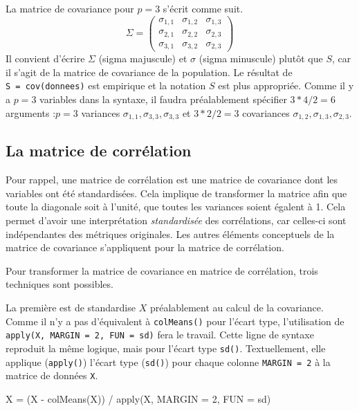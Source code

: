 \documentclass[
]{book}
\newenvironment{Shaded}{}{}
\newcommand{\AttributeTok}[1]{#1}
\newcommand{\DecValTok}[1]{#1}
\newcommand{\FunctionTok}[1]{#1}
\newcommand{\NormalTok}[1]{#1}
\newcommand{\OtherTok}[1]{#1}
\newcommand{\SpecialCharTok}[1]{#1}
\begin{document}
La matrice de covariance pour \(p=3\) s'écrit comme suit.
\[
\Sigma = \left( 
\begin{array}{ccc}
\sigma_{1,1} & \sigma_{1,2} & \sigma_{1,3}\\
\sigma_{2,1} & \sigma_{2,2} & \sigma_{2,3}\\
\sigma_{3,1} & \sigma_{3,2} & \sigma_{2,3}
\end{array}
\right)
\]
Il convient d'écrire \(\Sigma\) (sigma majuscule) et \(\sigma\) (sigma minuscule) plutôt que \(S\), car il s'agit de la matrice de covariance de la population. Le résultat de \texttt{S\ =\ cov(donnees)} est empirique et la notation \(S\) est plus appropriée. Comme il y a \(p=3\) variables dans la syntaxe, il faudra préalablement spécifier \(3*4/2 = 6\) arguments :\(p = 3\) variances \(\sigma_{1,1},\sigma_{3,3},\sigma_{3,3}\) et \(3*2/2 =3\) covariances \(\sigma_{1,2},\sigma_{1,3},\sigma_{2,3}\).

\hypertarget{la-matrice-de-corruxe9lation}{%
\subsection{La matrice de corrélation}\label{la-matrice-de-corruxe9lation}}

Pour rappel, une matrice de corrélation est une matrice de covariance dont les variables ont été standardisées. Cela implique de transformer la matrice afin que toute la diagonale soit à l'unité, que toutes les variances soient égalent à 1. Cela permet d'avoir une interprétation \emph{standardisée} des corrélations, car celles-ci sont indépendantes des métriques originales. Les autres éléments conceptuels de la matrice de covariance s'appliquent pour la matrice de corrélation.

Pour transformer la matrice de covariance en matrice de corrélation, trois techniques sont possibles.

La première est de standardise \(X\) préalablement au calcul de la covariance. Comme il n'y a pas d'équivalent à \texttt{colMeans()} pour l'écart type, l'utilisation de \texttt{apply(X,\ MARGIN\ =\ 2,\ FUN\ =\ sd)} fera le travail. Cette ligne de syntaxe reproduit la même logique, mais pour l'écart type \texttt{sd()}. Textuellement, elle applique (\texttt{apply()}) l'écart type (\texttt{sd()}) pour chaque colonne \texttt{MARGIN\ =\ 2} à la matrice de données \texttt{X}.

\begin{Shaded}
\begin{Highlighting}[]
\NormalTok{X }\OtherTok{=}\NormalTok{ (X }\SpecialCharTok{{-}} \FunctionTok{colMeans}\NormalTok{(X)) }\SpecialCharTok{/} \FunctionTok{apply}\NormalTok{(X, }\AttributeTok{MARGIN =} \DecValTok{2}\NormalTok{, }\AttributeTok{FUN =}\NormalTok{ sd)}
\end{Highlighting}
\end{Shaded}
\end{document}

